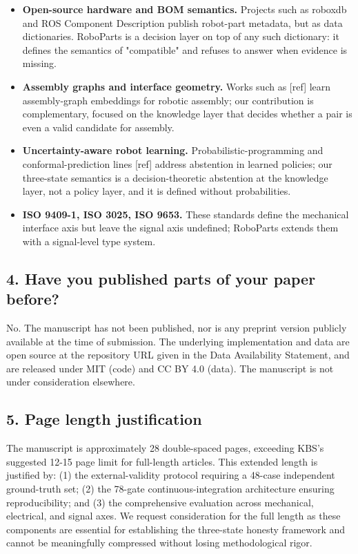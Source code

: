 \documentclass[11pt]{article}
\begin{document}
\begin{itemize}[leftmargin=*]
    \item \textbf{Open-source hardware and BOM semantics.} Projects such as roboxdb and ROS Component Description publish robot-part metadata, but as data dictionaries. RoboParts is a decision layer on top of any such dictionary: it defines the semantics of "compatible" and refuses to answer when evidence is missing.
    
    \item \textbf{Assembly graphs and interface geometry.} Works such as [ref] learn assembly-graph embeddings for robotic assembly; our contribution is complementary, focused on the knowledge layer that decides whether a pair is even a valid candidate for assembly.
    
    \item \textbf{Uncertainty-aware robot learning.} Probabilistic-programming and conformal-prediction lines [ref] address abstention in learned policies; our three-state semantics is a decision-theoretic abstention at the knowledge layer, not a policy layer, and it is defined without probabilities.
    
    \item \textbf{ISO 9409-1, ISO 3025, ISO 9653.} These standards define the mechanical interface axis but leave the signal axis undefined; RoboParts extends them with a signal-level type system.
\end{itemize}

\subsection*{4. Have you published parts of your paper before?}

\noindent No. The manuscript has not been published, nor is any preprint version publicly available at the time of submission. The underlying implementation and data are open source at the repository URL given in the Data Availability Statement, and are released under MIT (code) and CC BY 4.0 (data). The manuscript is not under consideration elsewhere.

\subsection*{5. Page length justification}

\noindent The manuscript is approximately 28 double-spaced pages, exceeding KBS's suggested 12-15 page limit for full-length articles. This extended length is justified by: (1) the external-validity protocol requiring a 48-case independent ground-truth set; (2) the 78-gate continuous-integration architecture ensuring reproducibility; and (3) the comprehensive evaluation across mechanical, electrical, and signal axes. We request consideration for the full length as these components are essential for establishing the three-state honesty framework and cannot be meaningfully compressed without losing methodological rigor.
\end{document}
